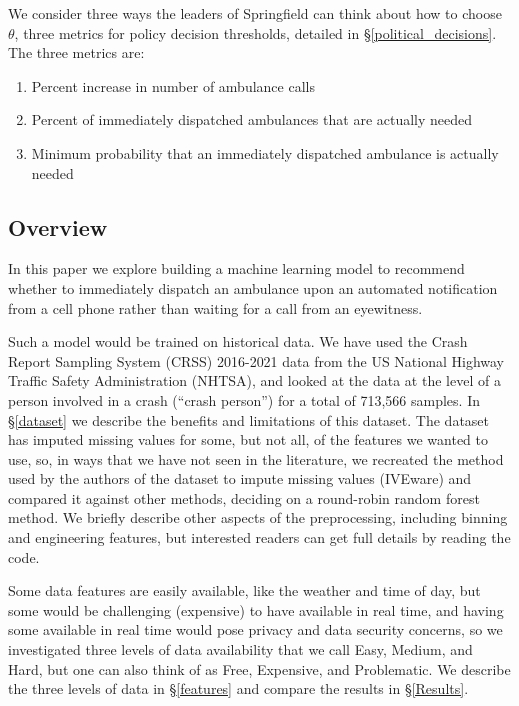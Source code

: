 We consider three ways the leaders of Springfield can think about how to choose $\theta$, three metrics for policy decision thresholds, detailed in \S \ref{political_decisions}.  The three metrics are:

\begin{enumerate}
	\item Percent increase in number of ambulance calls
	\item Percent of immediately dispatched ambulances that are actually needed
	\item Minimum probability that an immediately dispatched ambulance is actually needed
\end{enumerate}

\subsection{Overview}
\label{intro_overview}

In this paper we explore building a machine learning model to recommend whether to immediately dispatch an ambulance upon an automated notification from a cell phone rather than waiting for a call from an eyewitness.

Such a model would be trained on historical data.  We have used the Crash Report Sampling System (CRSS) 2016-2021 data from the US National Highway Traffic Safety Administration (NHTSA), and looked at the data at the level of a person involved in a crash (``crash person'') for a total of 713,566 samples.  In \S \ref{dataset} we describe the benefits and limitations of this dataset.  The dataset has imputed missing values for some, but not all, of the features we wanted to use, so, in ways that we have not seen in the literature, we recreated the method used by the authors of the dataset to impute missing values (IVEware) and compared it against other methods, deciding on a round-robin random forest method.  We briefly describe other aspects of the preprocessing, including binning and engineering features, but interested readers can get full details by reading the code.  

Some data features are easily available, like the weather and time of day, but some would be challenging (expensive) to have available in real time, and having some available in real time would pose privacy and data security concerns, so we investigated three levels of data availability that we call Easy, Medium, and Hard, but one can also think of as Free, Expensive, and Problematic.  We describe the three levels of data in \S \ref{features} and compare the results in \S  \ref{Results}.  

